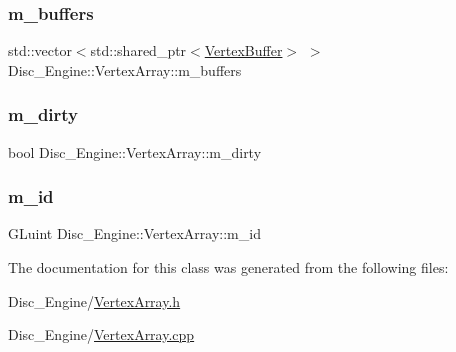 \subsubsection{\texorpdfstring{m\+\_\+buffers}{m\_buffers}}
{\footnotesize\ttfamily std\+::vector$<$std\+::shared\+\_\+ptr$<$\mbox{\hyperlink{class_disc___engine_1_1_vertex_buffer}{Vertex\+Buffer}}$>$ $>$ Disc\+\_\+\+Engine\+::\+Vertex\+Array\+::m\+\_\+buffers\hspace{0.3cm}{\ttfamily [private]}}

\mbox{\label{class_disc___engine_1_1_vertex_array_a718eddeec57b85c72b07bc350cb38caa}} 
\subsubsection{\texorpdfstring{m\+\_\+dirty}{m\_dirty}}
{\footnotesize\ttfamily bool Disc\+\_\+\+Engine\+::\+Vertex\+Array\+::m\+\_\+dirty\hspace{0.3cm}{\ttfamily [private]}}

\mbox{\label{class_disc___engine_1_1_vertex_array_ad5361d354e5ba5cf29a056bb2a9be3a3}} 
\subsubsection{\texorpdfstring{m\+\_\+id}{m\_id}}
{\footnotesize\ttfamily G\+Luint Disc\+\_\+\+Engine\+::\+Vertex\+Array\+::m\+\_\+id\hspace{0.3cm}{\ttfamily [private]}}



The documentation for this class was generated from the following files\+:\begin{DoxyCompactItemize}
\item 
Disc\+\_\+\+Engine/\mbox{\hyperlink{_vertex_array_8h}{Vertex\+Array.\+h}}\item 
Disc\+\_\+\+Engine/\mbox{\hyperlink{_vertex_array_8cpp}{Vertex\+Array.\+cpp}}\end{DoxyCompactItemize}
